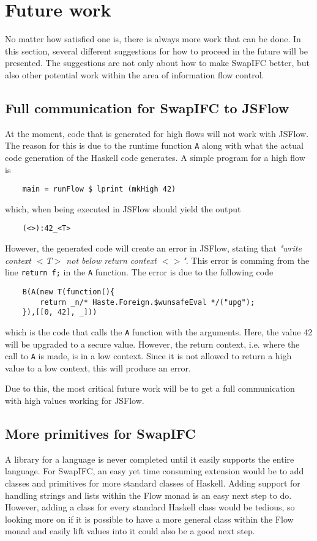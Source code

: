 \chapter{Future work}
\label{chapter:future}
No matter how satisfied one is, there is always more work that can be done. In this section, several different suggestions for how to proceed in the future will be presented. The suggestions are not only about how to make SwapIFC better, but also other potential work within the area of information flow control.

\section{Full communication for SwapIFC to JSFlow}
At the moment, code that is generated for high flows will not work with JSFlow. The reason for this is due to the runtime function {\tt A} along with what the actual code generation of the Haskell code generates. A simple program for a high flow is
\begin{verbatim}
    main = runFlow $ lprint (mkHigh 42)
\end{verbatim}
which, when being executed in JSFlow should yield the output
\begin{verbatim}
    (<>):42_<T>
\end{verbatim}
However, the generated code will create an error in JSFlow, stating that \emph{"write context \(<\)T\(>\) not below return context \(<>\)"}. This error is comming from the line {\tt return f;} in the {\tt A} function. The error is due to the following code
\begin{verbatim}
    B(A(new T(function(){
        return _n/* Haste.Foreign.$wunsafeEval */("upg");
    }),[[0, 42], _]))
\end{verbatim}
which is the code that calls the {\tt A} function with the arguments. Here, the value 42 will be upgraded to a secure value. However, the return context, i.e. where the call to {\tt A} is made, is in a low context. Since it is not allowed to return a high value to a low context, this will produce an error.

Due to this, the most critical future work will be to get a full communication with high values working for JSFlow.

\section{More primitives for SwapIFC}
\label{chapter:future-primitives}
A library for a language is never completed until it easily supports the entire language. For SwapIFC, an easy yet time consuming extension would be to add classes and primitives for more standard classes of Haskell. Adding support for handling strings and lists within the Flow monad is an easy next step to do. However, adding a class for every standard Haskell class would be tedious, so looking more on if it is possible to have a more general class within the Flow monad and easily lift values into it could also be a good next step.

